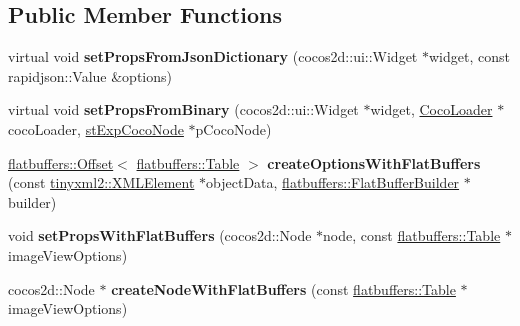 \subsection*{Public Member Functions}
\begin{DoxyCompactItemize}
\item 
\mbox{\label{classcocostudio_1_1ImageViewReader_a93d9adcd86a314264c28e3d469def723}} 
virtual void {\bfseries set\+Props\+From\+Json\+Dictionary} (cocos2d\+::ui\+::\+Widget $\ast$widget, const rapidjson\+::\+Value \&options)
\item 
\mbox{\label{classcocostudio_1_1ImageViewReader_a300dcb0bd4ba82b8a1026b64cdd865e8}} 
virtual void {\bfseries set\+Props\+From\+Binary} (cocos2d\+::ui\+::\+Widget $\ast$widget, \hyperlink{classcocostudio_1_1CocoLoader}{Coco\+Loader} $\ast$coco\+Loader, \hyperlink{structcocostudio_1_1stExpCocoNode}{st\+Exp\+Coco\+Node} $\ast$p\+Coco\+Node)
\item 
\mbox{\label{classcocostudio_1_1ImageViewReader_a89e898347fb67f6cacfba8706785f86b}} 
\hyperlink{structflatbuffers_1_1Offset}{flatbuffers\+::\+Offset}$<$ \hyperlink{classflatbuffers_1_1Table}{flatbuffers\+::\+Table} $>$ {\bfseries create\+Options\+With\+Flat\+Buffers} (const \hyperlink{classtinyxml2_1_1XMLElement}{tinyxml2\+::\+X\+M\+L\+Element} $\ast$object\+Data, \hyperlink{classflatbuffers_1_1FlatBufferBuilder}{flatbuffers\+::\+Flat\+Buffer\+Builder} $\ast$builder)
\item 
\mbox{\label{classcocostudio_1_1ImageViewReader_a48aed01c31ed5fbd54f14203f1eba9bc}} 
void {\bfseries set\+Props\+With\+Flat\+Buffers} (cocos2d\+::\+Node $\ast$node, const \hyperlink{classflatbuffers_1_1Table}{flatbuffers\+::\+Table} $\ast$image\+View\+Options)
\item 
\mbox{\label{classcocostudio_1_1ImageViewReader_a43955a243e41931c849513b851f9a396}} 
cocos2d\+::\+Node $\ast$ {\bfseries create\+Node\+With\+Flat\+Buffers} (const \hyperlink{classflatbuffers_1_1Table}{flatbuffers\+::\+Table} $\ast$image\+View\+Options)
\item 
\mbox{\label{classcocostudio_1_1ImageViewReader_a7451d62268f26bc16f41187764c8fd3d}} 

\end{DoxyCompactItemize}
